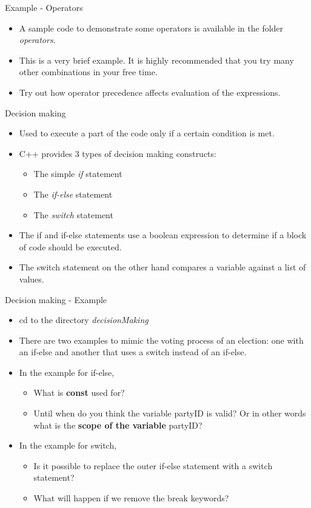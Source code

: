 \documentclass[aspectratio=169]{beamer}
\begin{document}
\begin{frame}[fragile]{Example - Operators}
	\begin{itemize}
		\item A sample code to demonstrate some operators is available in the folder \textit{operators}.
		\item This is a very brief example. It is highly recommended that you try many other combinations in your free time.
		\item Try out how operator precedence affects evaluation of the expressions.
	\end{itemize}
\end{frame}

\begin{frame}[fragile]{Decision making}
	\begin{itemize}
		\item Used to execute a part of the code only if a certain condition is met.
		\item C++ provides 3 types of decision making constructs:
		\begin{itemize}
			\item The simple \textit{if} statement
			\item The \textit{if-else} statement
			\item The \textit{switch} statement
		\end{itemize}
		\item The if and if-else statements use a boolean expression to determine if a block of code should be executed.
		\item The switch statement on the other hand compares a variable against a list of values.
	\end{itemize}
\end{frame}

\begin{frame}[fragile]{Decision making - Example}
	\begin{itemize}
		\item cd to the directory \textit{decisionMaking}
		\item There are two examples to mimic the voting process of an election: one with an if-else and another that uses a switch instead of an if-else.
		\item In the example for if-else, 
		\begin{itemize}
			\item What is \textbf{const} used for?
			\item Until when do you think the variable partyID is valid? Or in other words what is the \textbf{scope of the variable} partyID?
		\end{itemize}
		\item In the example for switch, 
		\begin{itemize}
			\item Is it possible to replace the outer if-else statement with a switch statement?
			\item What will happen if we remove the break keywords?
		\end{itemize}
	\end{itemize}
\end{frame}
\end{document}
